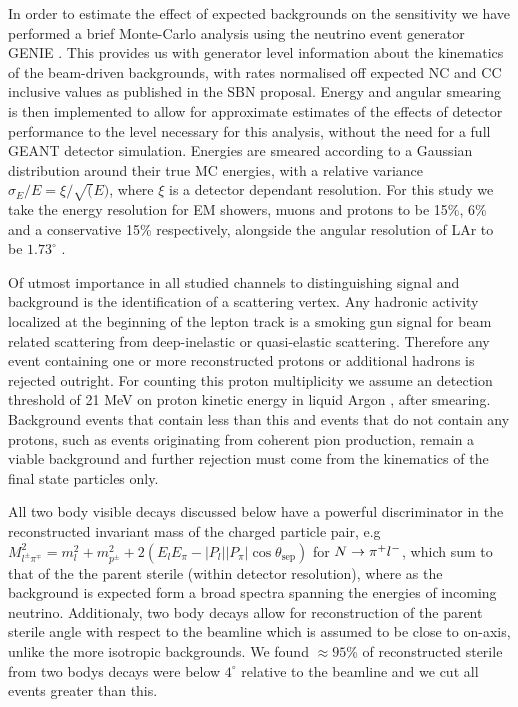 \documentclass[11pt, a4paper]{article}
\def\ster{\ensuremath N}
\begin{document}
In order to estimate the effect of expected backgrounds on the sensitivity we
have performed a brief Monte-Carlo analysis using the neutrino event generator GENIE
\cite{Andreopoulos:2009rq}. This provides us with generator level information about the
kinematics of the beam-driven backgrounds, with rates normalised off expected
NC and CC inclusive values as published in the SBN proposal. Energy and angular
smearing is then implemented to allow for approximate estimates of the effects
of detector performance to the level necessary for this analysis, without the
need for a full GEANT detector simulation. Energies are smeared according to a
Gaussian distribution around their true MC energies, with a relative variance
$\sigma_E/E = \xi/ \sqrt(E) $, where $\xi$ is a detector dependant resolution.
For this study we take the energy resolution for EM showers, muons and protons
to be 15\%, 6\% and a conservative 15\% respectively, alongside the angular
resolution of LAr to be $1.73^{\circ}$ \cite{Antonello:2015lea}. 

Of utmost importance in all studied channels to distinguishing signal and
background is the identification of a scattering vertex. Any hadronic activity
localized at the beginning of the lepton track is a smoking gun signal for beam
related scattering from deep-inelastic or quasi-elastic scattering. Therefore
any event containing one or more reconstructed protons or additional hadrons is
rejected outright. For counting this proton multiplicity we assume an detection
threshold of 21 MeV on proton kinetic energy in liquid Argon \cite{Acciarri:2014gev}, after smearing.
Background events that contain less than this and events that do not contain
any protons, such as events originating from coherent pion production, remain a
viable background and further rejection must come from the kinematics of the
final state particles only.

All two body visible decays discussed below have a powerful discriminator in
the reconstructed invariant mass of the charged particle pair, e.g  $M_{l^\pm
\pi^\mp}^2=m_l^2+m_{p^\pm}^2+ 2(E_l E_\pi - |P_l||P_\pi|\cos\theta_\text{sep})$
for $\ster\rightarrow \pi^+ l^-$, which sum to that of the the parent sterile
(within detector resolution), where as the background is expected form a broad
spectra spanning the energies of incoming neutrino. Additionaly, two body
decays allow for reconstruction of the parent sterile angle with respect to the
beamline which is assumed to be close to on-axis, unlike the more isotropic
backgrounds. We found $\approx 95$\% of reconstructed sterile from two bodys
decays were below $4^\circ$ relative to the beamline and we cut all events
greater than this. 
\end{document}
